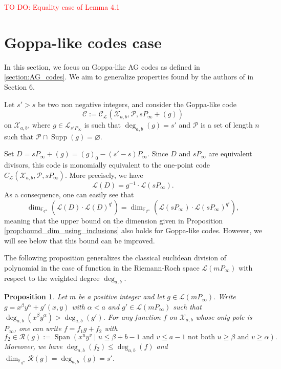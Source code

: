 \documentclass[a4paper]{article}
\newtheorem{proposition}[thm]{Proposition}
\theoremstyle{definition}
\theoremstyle{remark}
\newcommand{\calP}{\mathcal{P}}
\newcommand{\calL}{\mathcal{L}}
\newcommand{\calC}{\mathcal{C}}
\newcommand{\calR}{\mathcal{R}}
\newcommand{\calX}{\mathcal{X}}
\newcommand{\fqm}{\mathbb{F}_{q^m}}
\newcommand{\Span}[1]{\operatorname{Span}\left(#1\right)}
\newcommand{\Supp}{\operatorname{Supp}}
\newcommand{\degab}[1]{\deg_{a,b}\left(#1\right)}
\newcommand\TODO[1]{\textcolor{red}{TO DO: #1}}
\begin{document}
\TODO{Equality case of Lemma 4.1}

\section{Goppa-like codes case}

In this section, we focus on Goppa-like AG codes as defined in \ref{section:AG_codes}. We aim to generalize properties found by the authors of \cite{MT21} in Section 6. 

\noindent Let $s' > s$ be two non negative integers, and consider the Goppa-like code 
$$\calC := \calC_{\calL}(\calX_{a,b},\calP,sP_\infty+(g))$$
on $\calX_{a,b}$, where $g \in \calL_{s'P_\infty}$ is such that $\degab{g} = s'$ and $\calP$ is a set of length $n$such that $\calP \cap \Supp(g) = \varnothing$. 

\noindent Set $D=sP_\infty+(g)=(g)_0-(s'-s)P_\infty$.  
Since $D$ and $sP_\infty$ are equivalent divisors, this code is monomially equivalent to the one-point code $C_{\calL}(\calX_{a,b},\calP,sP_\infty)$. 
More precisely, we have
$$\calL(D) = g^{-1} \cdot \calL(sP_{\infty}).$$
As a consequence, one can easily see that
\[\dim_{\fqm} \left(\calL(D)\cdot \calL(D)^{q^i}\right) = \dim_{\fqm} \left(\calL(sP_\infty)\cdot \calL(sP_\infty)^{q^i}\right),\]
meaning that the upper bound on the dimension given in Proposition \ref{prop:bound_dim_using_inclusions} also holds for Goppa-like codes. However, we will see below that this bound can be improved.

\noindent The following proposition generalizes the classical euclidean division of polynomial in the case of function in the Riemann-Roch space $\calL(mP_\infty)$ with respect to the weighted degree $\deg_{a,b}$.

\begin{proposition}\label{prop:div_grob}
Let $m$ be a positive integer and let $g \in \calL(m P_\infty)$. Write $g=x^\beta y^\alpha +g'(x,y)$ with $\alpha < a$ and $g' \in \calL(m P_\infty)$ such that $\degab{x^\beta y^\alpha}>\degab{g'}$.
For any function $f$ on $\calX_{a,b}$ whose only pole is $P_\infty$, one can write $f=f_1g+f_2$ with 
\[f_2 \in \calR(g):= \Span{x^u y^v \mid u \leq \beta + b-1 \text{ and } v\leq a-1 \text{ not both }  u \geq \beta \text{ and } v \geq \alpha}.\]
Moreover, we have $\degab{f_2} \leq \degab{f}$ and $\dim_{\fqm} \calR(g) = \degab{g}=s'$. 
\end{proposition}
\end{document}
